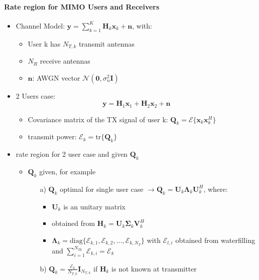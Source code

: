 \documentclass[a4paper, 10pt]{article}
\begin{document}
\paragraph{Rate region for MIMO Users and Receivers}
\begin{itemize}
	\item Channel Model: $ \mathbf{y} = \sum_{k = 1}^{K}\mathbf{H}_k\mathbf{x}_k + \mathbf{n} $, with:
	\begin{itemize}
		\item User k has $N_{T,k} $ transmit antennas
		\item $N_R $ receive antennas
		\item $\mathbf{n} $: AWGN vector $\mathcal{N}(\mathbf{0},\sigma_n^2\mathbf{I})$
	\end{itemize}
	\item 2 Users case: 
	\begin{equation}
		\mathbf{y} = \mathbf{H}_1\mathbf{x}_1 + \mathbf{H}_2\mathbf{x}_2 + \mathbf{n}  \label{eq:Formel_7}
	\end{equation}	 
	\begin{itemize}
		\item Covariance matrix of the TX signal of user k: $\mathbf{Q}_k = \mathcal{E}\{\mathbf{x}_k\mathbf{x}_k^H\} $
		\item transmit power: $\mathcal{E}_k = \text{tr}\{\mathbf{Q}_k\} $
	\end{itemize}
	\item rate region for 2 user case and given $\mathbf{Q}_k$
	\begin{itemize}
		\item $\mathbf{Q}_k $ given, for example 
		\begin{itemize}
			\item[a)] $\mathbf{Q}_k$ optimal for single user case $\rightarrow \mathbf{Q}_k = \mathbf{U}_k\mathbf{\Lambda}_k\mathbf{U}_k^H $, where:
			\begin{itemize}
				\item $\mathbf{U}_k $ is an unitary matrix 
				\item obtained from $\mathbf{H}_k = \mathbf{U}_k\mathbf{\Sigma}_k\mathbf{V}_k^H $
				\item $\mathbf{\Lambda}_k = \text{diag}\{\mathcal{E}_{k,1},\mathcal{E}_{k,2},\ldots,\mathcal{E}_{k,N_T}\} $ with $\mathcal{E}_{l,i} $ obtained from waterfilling and $\sum_{i = 1}^{N_{Tk}}\mathcal{E}_{k,i} = \mathcal{E}_k $
			\end{itemize}
			\item[b)] $\mathbf{Q}_k = \frac{\mathcal{E}_k}{N_{T,k}}\mathbf{I}_{N_{T,k}} $ if $\mathbf{H}_k $ is not known at transmitter

\end{itemize}
\end{itemize}
\end{itemize}
\end{document}
